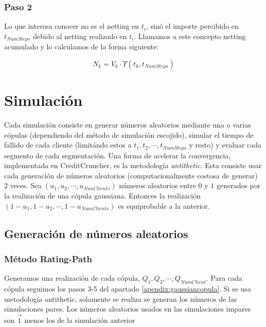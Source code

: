 \subsubsection{Paso 2}

Lo que interesa conocer no es el netting en $t_i$, sin\'o el importe
percibido en $t_{NumSteps}$ debido al netting realizado en $t_i$.
Llamamos a este concepto netting acumulado y lo calculamos de la
forma siguiente:

\begin{displaymath}
N_k =  V_k \cdot \Upsilon(t_k,t_{NumSteps})
\end{displaymath}


\section{Simulaci\'on}

Cada simulaci\'on consiste en generar n\'umeros aleatorios
mediante una o varias c\'opulas (dependiendo del m\'etodo de
simulaci\'on escojido), simular el tiempo de fallido de cada
cliente (limit\'ando estos a $t_1, t_2, \cdots, t_{NumSteps}$ y
resto) y evaluar cada segmento de cada segmentaci\'on.
\newline
\newline
Una forma de acelerar la convergencia, implementada en CreditCruncher,
es la metodolog\'ia \emph{antithetic}. Esta consiste
usar cada generaci\'on de n\'umeros aleatorios (computacionalmente
costosa de generar) 2 veces. Sea $(u_1, u_2, \cdots, u_{NunClients})$
n\'umeros aleatorios entre $0$ y $1$ generados por la realizaci\'on
de una c\'opula gaussiana. Entonces la realizaci\'on
$(1-u_1, 1-u_2, \cdots, 1-u_{NumClients})$ es equiprobable a la anterior.

\subsection{Generaci\'on de n\'umeros aleatorios}

\subsubsection{M\'etodo Rating-Path}

Generamos una realizaci\'on de cada c\'opula, $Q_1, Q_2, \cdots, Q_{NumClient}$.
Para cada c\'opula seguimos los pasos 3-5 del apartado \ref{apendix:gaussiancopula}.
\newline
\newline
Si se usa metodolog\'ia antithetic, solamente se realiza se generan los n\'umeros 
de las simulaciones pares. Los n\'umeros aleatorios usados en las simulaciones
impares son $\vec{1}$ menos los de la simulaci\'on anterior 

